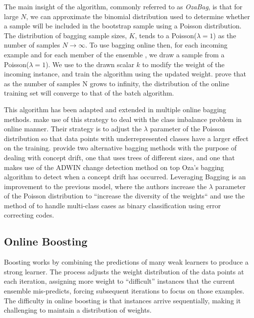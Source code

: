 The main insight of the algorithm, commonly referred to as \emph{OzaBag}, is that for large $N$, we can approximate the binomial distribution
used to determine whether a sample will be included in the bootstrap
sample using a Poisson distribution. The distribution of bagging sample sizes, $K$, tends
to a Poisson($\lambda = 1$) as the number of samples $N \rightarrow \infty$. To use bagging online then,
for each incoming example and
for each member of the ensemble \ensemble, we draw a sample from a Poisson($\lambda = 1$). We use to the drawn scalar $k$ to modify the weight of the incoming instance, and train the algorithm using the updated weight. \citet{Oza2001online} prove that as the number of samples N grows
to infinity, the distribution of the online training set will converge to that of the batch algorithm.

This algorithm has been adapted and extended in multiple online bagging methods. \citet{online-bag-imbalance}
make use of this strategy to deal with the class imbalance problem in online manner. Their strategy
is to adjust the $\lambda$ parameter of the Poisson distribution so that data points with underrepresented
classes have a larger effect on the training. \citet{new-ensemble-methods} provide two alternative
bagging methods with the purpose of dealing with concept drift, one that uses trees of different
sizes, and one that makes use of the ADWIN \cite{adwin} change detection method on top Oza's bagging algorithm to detect when a concept drift has occurred. Leveraging Bagging \cite{leveraging-bagging} is an improvement to the previous model,
where the authors increase the $\lambda$ parameter of the Poisson distribution to ``increase the diversity of the weights`` and use the method of \citet{multiclass-codes} to handle multi-class cases
as binary classification using error correcting codes.

\subsection{Online Boosting}

Boosting works by combining the predictions of many weak learners to produce a
strong learner. The process adjusts the weight distribution of the data points
at each iteration, assigning more weight to ``difficult'' instances that the
current ensemble mis-predicts, forcing subsequent iterations to focus on those
examples. The difficulty in online boosting is that
instances arrive sequentially, making it challenging to maintain a distribution
of weights.

